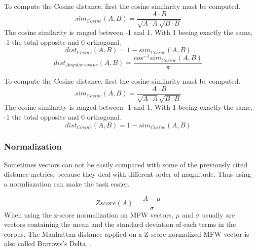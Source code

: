 \begin{definition}
  \label{def:cosine_dist}
  To compute the Cosine distance, first the cosine similarity must be computed.
  \begin{equation}
    sim_{Cosine}(A, B) = \frac{A \cdot B}{\sqrt{A \cdot A}\sqrt{B \cdot B}}
  \end{equation}
  The cosine similarity is ranged between -1 and 1.
  With 1 beeing exactly the same, -1 the total opposite and 0 orthogonal.
  \begin{equation}
    dist_{Cosine}(A, B) = 1 - sim_{Cosine}(A, B)
  \end{equation}
  \begin{equation}
    dist_{Angular\ cosine}(A, B) = \frac{cos^{-1}sim_{Cosine}(A, B)}{\pi}
  \end{equation}
\end{definition}

\begin{definition}
  \label{def:cosine_dist}
  To compute the Cosine distance, first the cosine similarity must be computed.
  \begin{equation}
    sim_{Cosine}(A, B) = \frac{A \cdot B}{\sqrt{A \cdot A}\sqrt{B \cdot B}}
  \end{equation}
  The cosine similarity is ranged between -1 and 1.
  With 1 beeing exactly the same, -1 the total opposite and 0 orthogonal.
  \begin{equation}
    dist_{Cosine}(A, B) = 1 - sim_{Cosine}(A, B)
  \end{equation}
  \begin{equation}
  \end{equation}
\end{definition}

\subsubsection{Normalization}

Sometimes vectors can not be easily compared with some of the previously cited distance metrics, because they deal with different order of magnitude.
Thus using a normliazation can make the task easier.

\begin{definition}
  \begin{equation}
    Zscore(A) = \frac{A - \mu}{\sigma}
  \end{equation}
  When using the z-score normalization on MFW vectors, $\mu$ and $\sigma$ usually are vectors containing the mean and the standard deviation of each terms in the corpus.
  The Manhattan distance applied on a Z-score normalized MFW vector is also called Burrows's Delta~\cite{savoy_stylo}.
\end{definition}

